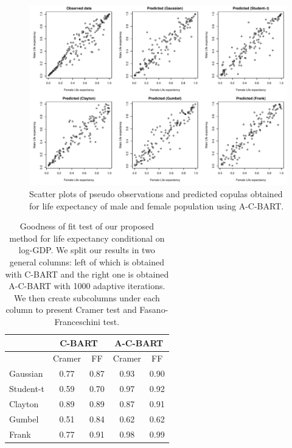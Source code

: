 \documentclass{amsart}
\begin{document}
\begin{figure}
	\centering
	\includegraphics[width = 0.95\linewidth]{"LE_vs_GDP_wa.pdf"}
	\caption{Scatter plots of pseudo observations and predicted copulas obtained for life expectancy of male and female population using A-C-BART.}
	\label{fig:pseudo:LE:wa}
\end{figure}

\begin{table}
	\centering
	\begin{tabular}{l|cc|cc}
		\multicolumn{1}{c|}{} &
		\multicolumn{2}{c|}{C-BART} &
		\multicolumn{2}{c}{A-C-BART} \\
		\midrule
		& Cramer & FF & Cramer & FF \\ 
		\midrule
		Gaussian & 0.77 & 0.87 & 0.93 & 0.90 \\ 
		Student-t & 0.59 & 0.70 & 0.97 & 0.92 \\ 
		Clayton & 0.89 & 0.89 & 0.87 & 0.91 \\ 
		Gumbel & 0.51 & 0.84 & 0.62 & 0.62 \\ 
		Frank & 0.77 & 0.91 & 0.98 & 0.99 \\ 
	\end{tabular}
	\caption{Goodness of fit test of our proposed method for life expectancy conditional on log-GDP. We split our results in two general columns: left of which is obtained with C-BART and the right one is obtained A-C-BART with 1000 adaptive iterations. We then create subcolumns under each column to present Cramer test and Fasano-Franceschini test.}
	\label{tab:LE:p-val}
\end{table}
\end{document}
